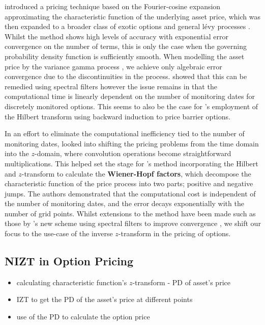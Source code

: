 \documentclass[a4paper]{report}
\begin{document}
\citet{fang2009novel} introduced a pricing technique based on the Fourier-cosine expansion approximating the characteristic function of the underlying asset price, which was then expanded to a broader class of exotic options \citep{fang2009pricing, fang2011fourier} and general l\'evy processes \citep{lord2008fast}. Whilst the method shows high levels of accuracy with exponential error convergence on the number of terms, this is only the case when the governing probability density function is sufficiently smooth. When modelling the asset price by the variance gamma process \citep{madan1998variance}, we achieve only algebraic error convergence due to the discontinuities in the process. \citet{ruijter2015application} showed that this can be remedied using spectral filters however the issue remains in that the computational time is linearly dependent on the number of monitoring dates for discretely monitored options. This seems to also be the case for \citet{feng2008pricing}'s employment of the Hilbert transform using backward induction to price barrier options. 

In an effort to eliminate the computational inefficiency tied to the number of monitoring dates, \citet{fusai2006exact} looked into shifting the pricing problems from the time domain into the $z$-domain, where convolution operations become straightforward multiplications. This helped set the stage for \citet{fusai2016spitzer}'s method incorporating the Hilbert and $z$-transform to calculate the \textbf{Wiener-Hopf factors}, which decompose the characteristic function of the price process into two parts; positive and negative jumps. The authors demonstrated that the computational cost is independent of the number of monitoring dates, and the error decays exponentially with the number of grid points. Whilst extensions to the method have been made such as those by \citet{phelan2018fourier}'s new scheme using spectral filters to improve convergence \citep{phelan2019hilbert}, we shift our focus to the use-case of the inverse $z$-transform in the pricing of options.

\subsection{NIZT in Option Pricing}
\begin{itemize}
    \item calculating characteristic function's $z$-transform - PD of asset's price
    \item IZT to get the PD of the asset's price at different points
    \item use of the PD to calculate the option price
\end{itemize}
\end{document}
